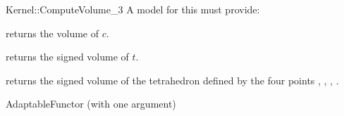 \begin{ccRefFunctionObjectConcept}{Kernel::ComputeVolume_3}
A model for this must provide:


       {returns the volume of $c$. }

       {returns the signed volume of $t$. }

       {returns the signed volume of the tetrahedron defined by the four
        points , , , . }

\ccRefines
AdaptableFunctor (with one argument)

\ccSeeAlso

 \\
 \\

\end{ccRefFunctionObjectConcept}
